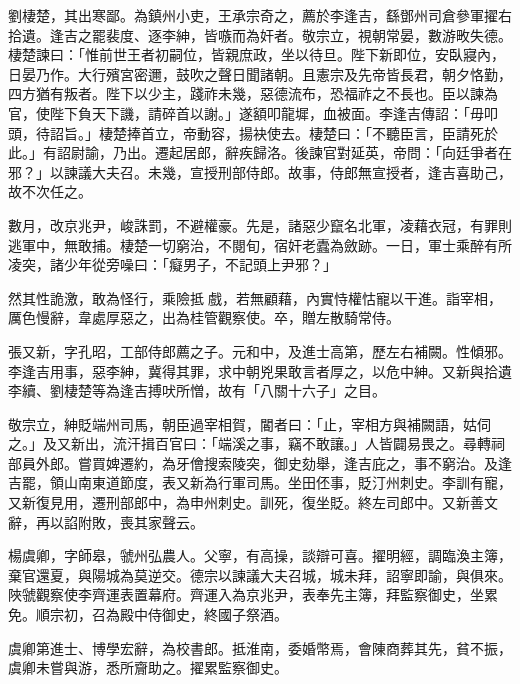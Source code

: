 \begin{pinyinscope}
 劉棲楚，其出寒鄙。為鎮州小吏，王承宗奇之，薦於李逢吉，繇鄧州司倉參軍擢右拾遺。逢吉之罷裴度、逐李紳，皆嗾而為奸者。敬宗立，視朝常晏，數游畋失德。棲楚諫曰：「惟前世王者初嗣位，皆親庶政，坐以待旦。陛下新即位，安臥寢內，日晏乃作。大行殯宮密邇，鼓吹之聲日聞諸朝。且憲宗及先帝皆長君，朝夕恪勤，四方猶有叛者。陛下以少主，踐祚未幾，惡德流布，恐福祚之不長也。臣以諫為官，使陛下負天下譏，請碎首以謝。」遂額叩龍墀，血被面。李逢吉傳詔：「毋叩頭，待詔旨。」棲楚捧首立，帝動容，揚袂使去。棲楚曰：「不聽臣言，臣請死於此。」有詔尉諭，乃出。遷起居郎，辭疾歸洛。後諫官對延英，帝問：「向廷爭者在邪？」以諫議大夫召。未幾，宣授刑部侍郎。故事，侍郎無宣授者，逢吉喜助己，故不次任之。



 數月，改京兆尹，峻誅罰，不避權豪。先是，諸惡少竄名北軍，凌藉衣冠，有罪則逃軍中，無敢捕。棲楚一切窮治，不閱旬，宿奸老蠹為斂跡。一日，軍士乘醉有所凌突，諸少年從旁噪曰：「癡男子，不記頭上尹邪？」



 然其性詭激，敢為怪行，乘險抵戲，若無顧藉，內實恃權怙寵以干進。詣宰相，厲色慢辭，韋處厚惡之，出為桂管觀察使。卒，贈左散騎常侍。



 張又新，字孔昭，工部侍郎薦之子。元和中，及進士高第，歷左右補闕。性傾邪。李逢吉用事，惡李紳，冀得其罪，求中朝兇果敢言者厚之，以危中紳。又新與拾遺李續、劉棲楚等為逢吉搏吠所憎，故有「八關十六子」之目。



 敬宗立，紳貶端州司馬，朝臣過宰相賀，閽者曰：「止，宰相方與補闕語，姑伺之。」及又新出，流汗揖百官曰：「端溪之事，竊不敢讓。」人皆闢易畏之。尋轉祠部員外郎。嘗買婢遷約，為牙儈搜索陵突，御史劾舉，逢吉庇之，事不窮治。及逢吉罷，領山南東道節度，表又新為行軍司馬。坐田伾事，貶汀州刺史。李訓有寵，又新復見用，遷刑部郎中，為申州刺史。訓死，復坐貶。終左司郎中。又新善文辭，再以諂附敗，喪其家聲云。



 楊虞卿，字師皋，虢州弘農人。父寧，有高操，談辯可喜。擢明經，調臨渙主簿，棄官還夏，與陽城為莫逆交。德宗以諫議大夫召城，城未拜，詔寧即諭，與俱來。陜虢觀察使李齊運表置幕府。齊運入為京兆尹，表奉先主簿，拜監察御史，坐累免。順宗初，召為殿中侍御史，終國子祭酒。



 虞卿第進士、博學宏辭，為校書郎。抵淮南，委婚幣焉，會陳商葬其先，貧不振，虞卿未嘗與游，悉所齎助之。擢累監察御史。




\end{pinyinscope}

